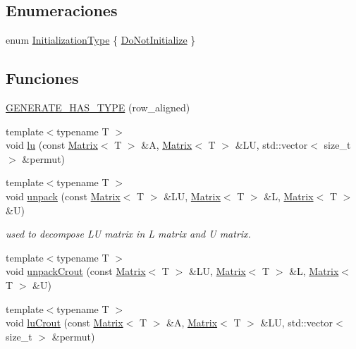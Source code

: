 \subsection*{Enumeraciones}
\begin{DoxyCompactItemize}
\item 
enum \hyperlink{namespaceanpi_a57664960c64a6275e3bf1c70d6fab177}{Initialization\+Type} \{ \hyperlink{namespaceanpi_a57664960c64a6275e3bf1c70d6fab177ae52a283781be1305088afb0aeb8c8d9a}{Do\+Not\+Initialize}
 \}
\end{DoxyCompactItemize}
\subsection*{Funciones}
\begin{DoxyCompactItemize}
\item 
\hyperlink{namespaceanpi_aa4460e71e1b9b94142b19fb1515b5fe6}{G\+E\+N\+E\+R\+A\+T\+E\+\_\+\+H\+A\+S\+\_\+\+T\+Y\+PE} (row\+\_\+aligned)
\item 
{\footnotesize template$<$typename T $>$ }\\void \hyperlink{namespaceanpi_a5a07147896ea864598b821b8a57401d4}{lu} (const \hyperlink{classanpi_1_1Matrix}{Matrix}$<$ T $>$ \&A, \hyperlink{classanpi_1_1Matrix}{Matrix}$<$ T $>$ \&LU, std\+::vector$<$ size\+\_\+t $>$ \&permut)
\item 
{\footnotesize template$<$typename T $>$ }\\void \hyperlink{namespaceanpi_a02b3ba58e1fd11d7b703dceae3032eb0}{unpack} (const \hyperlink{classanpi_1_1Matrix}{Matrix}$<$ T $>$ \&LU, \hyperlink{classanpi_1_1Matrix}{Matrix}$<$ T $>$ \&L, \hyperlink{classanpi_1_1Matrix}{Matrix}$<$ T $>$ \&U)
\begin{DoxyCompactList}\small\item\em used to decompose LU matrix in L matrix and U matrix. \end{DoxyCompactList}\item 
{\footnotesize template$<$typename T $>$ }\\void \hyperlink{namespaceanpi_a86ce2c50ec12569f9ba21aba793d2eb7}{unpack\+Crout} (const \hyperlink{classanpi_1_1Matrix}{Matrix}$<$ T $>$ \&LU, \hyperlink{classanpi_1_1Matrix}{Matrix}$<$ T $>$ \&L, \hyperlink{classanpi_1_1Matrix}{Matrix}$<$ T $>$ \&U)
\item 
{\footnotesize template$<$typename T $>$ }\\void \hyperlink{namespaceanpi_ac00c57424db725979943eb8807e53a6e}{lu\+Crout} (const \hyperlink{classanpi_1_1Matrix}{Matrix}$<$ T $>$ \&A, \hyperlink{classanpi_1_1Matrix}{Matrix}$<$ T $>$ \&LU, std\+::vector$<$ size\+\_\+t $>$ \&permut)

\end{DoxyCompactItemize}
